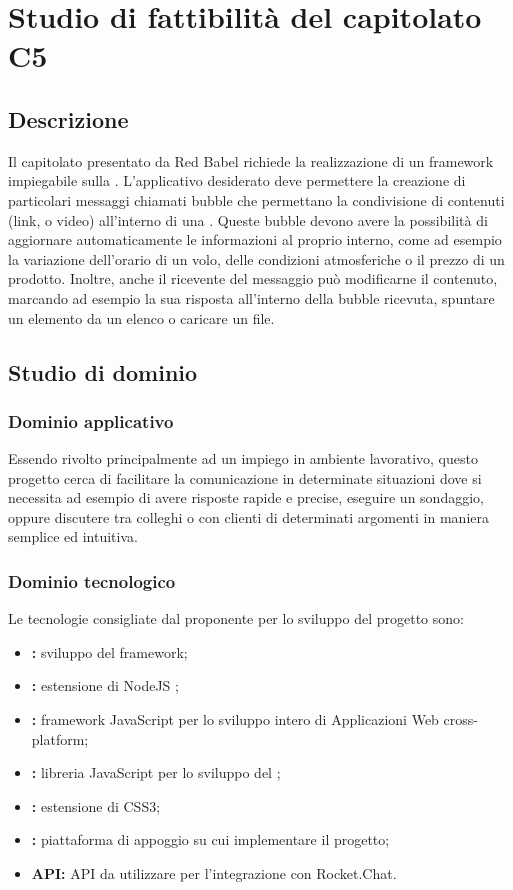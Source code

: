 \documentclass[../StudioDiFattibilita.tex]{subfiles}
\begin{document}
\section{Studio di fattibilità del capitolato C5}
	\subsection{Descrizione}
	Il capitolato  presentato da Red Babel richiede la realizzazione di un framework impiegabile sulla  . L'applicativo desiderato deve permettere la creazione di particolari messaggi chiamati bubble che permettano la condivisione di contenuti (link,  o video) all'interno di una . Queste bubble devono avere la possibilità di aggiornare automaticamente le informazioni al proprio interno, come ad esempio la variazione dell'orario di un volo, delle condizioni atmosferiche o il prezzo di un prodotto. Inoltre, anche il ricevente del messaggio può modificarne il contenuto, marcando ad esempio la sua risposta all'interno della bubble ricevuta, spuntare un elemento da un elenco o caricare un file.

	\subsection{Studio di dominio}
	  	\subsubsection{Dominio applicativo}
		Essendo  rivolto principalmente ad un impiego in ambiente lavorativo, questo progetto cerca di facilitare la comunicazione in determinate situazioni dove si necessita ad esempio di avere risposte rapide e precise, eseguire un sondaggio, oppure discutere tra colleghi o con clienti di determinati argomenti in maniera semplice ed intuitiva.

	 	\subsubsection{Dominio tecnologico}
		Le tecnologie consigliate dal proponente per lo sviluppo del progetto sono:
            	\begin{itemize}
            		\item\textbf{:} sviluppo del framework;
            		\item\textbf{:} estensione di NodeJS ;
            		\item\textbf{:} framework JavaScript per lo sviluppo intero di Applicazioni Web cross-platform\gl;
            		\item\textbf{:} libreria JavaScript per lo sviluppo del ;
            		\item\textbf{:} estensione di CSS3;
            		\item\textbf{:} piattaforma di appoggio su cui implementare il progetto;
            		\item\textbf{ API:} API da utilizzare per l'integrazione con Rocket.Chat.
				\end{itemize}
\end{document}

